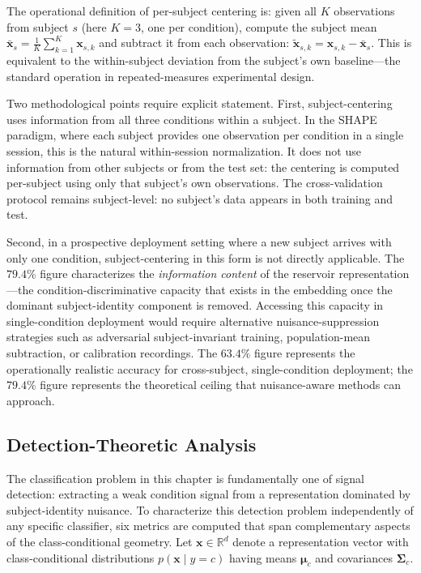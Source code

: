 The operational definition of per-subject centering is: given all $K$ observations from subject $s$ (here $K = 3$, one per condition), compute the subject mean $\bar{\mathbf{x}}_s = \frac{1}{K}\sum_{k=1}^K \mathbf{x}_{s,k}$ and subtract it from each observation: $\tilde{\mathbf{x}}_{s,k} = \mathbf{x}_{s,k} - \bar{\mathbf{x}}_s$. This is equivalent to the within-subject deviation from the subject's own baseline---the standard operation in repeated-measures experimental design.

Two methodological points require explicit statement. First, subject-centering uses information from all three conditions within a subject. In the SHAPE paradigm, where each subject provides one observation per condition in a single session, this is the natural within-session normalization. It does not use information from other subjects or from the test set: the centering is computed per-subject using only that subject's own observations. The cross-validation protocol remains subject-level: no subject's data appears in both training and test.

Second, in a prospective deployment setting where a new subject arrives with only one condition, subject-centering in this form is not directly applicable. The $79.4\%$ figure characterizes the \emph{information content} of the reservoir representation---the condition-discriminative capacity that exists in the embedding once the dominant subject-identity component is removed. Accessing this capacity in single-condition deployment would require alternative nuisance-suppression strategies such as adversarial subject-invariant training, population-mean subtraction, or calibration recordings. The $63.4\%$ figure represents the operationally realistic accuracy for cross-subject, single-condition deployment; the $79.4\%$ figure represents the theoretical ceiling that nuisance-aware methods can approach.

\subsection{Detection-Theoretic Analysis}

The classification problem in this chapter is fundamentally one of signal detection: extracting a weak condition signal from a representation dominated by subject-identity nuisance. To characterize this detection problem independently of any specific classifier, six metrics are computed that span complementary aspects of the class-conditional geometry. Let $\mathbf{x} \in \mathbb{R}^d$ denote a representation vector with class-conditional distributions $p(\mathbf{x} \mid y = c)$ having means $\boldsymbol{\mu}_c$ and covariances $\boldsymbol{\Sigma}_c$.

